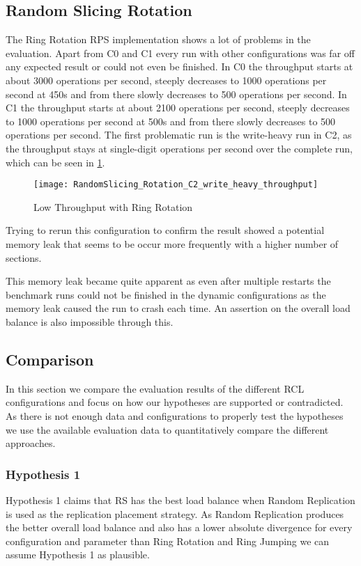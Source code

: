 \subsection{Random Slicing Rotation}
The Ring Rotation \ac{RPS} implementation shows a lot of problems in the evaluation.
Apart from C0 and C1 every run with other configurations was far off any expected result or could not even be finished.
In C0 the throughput starts at about 3000 operations per second, steeply decreases to 1000 operations per second at 450s and from there slowly decreases to 500 operations per second.
In C1 the throughput starts at about 2100 operations per second, steeply decreases to 1000 operations per second at 500s and from there slowly decreases to 500 operations per second.
The first problematic run is the write-heavy run in C2, as the throughput stays at single-digit operations per second over the complete run, which can be seen in \cref{fig:random_slicing_rotation_throughput}.
\begin{figure}
\center
\texttt{[image: RandomSlicing\_Rotation\_C2\_write\_heavy\_throughput]}
\caption[Low Throughput with Ring Rotation]{Low Throughput with Ring Rotation}
\label{fig:random_slicing_rotation_throughput}
\end{figure}
Trying to rerun this configuration to confirm the result showed a potential memory leak that seems to be occur more frequently with a higher number of sections.

This memory leak became quite apparent as even after multiple restarts the benchmark runs could not be finished in the dynamic configurations as the memory leak caused the run to crash each time.
An assertion on the overall load balance is also impossible through this.


\subsection{Comparison}
In this section we compare the evaluation results of the different \ac{RCL} configurations and focus on how our hypotheses are supported or contradicted.
As there is not enough data and configurations to properly test the hypotheses we use the available evaluation data to quantitatively compare the different approaches.

\subsubsection{Hypothesis 1}
Hypothesis 1 claims that \ac{RS} has the best load balance when Random Replication is used as the replication placement strategy.
As Random Replication produces the better overall load balance and also has a lower absolute divergence for every configuration and parameter than Ring Rotation and Ring Jumping we can assume Hypothesis 1 as plausible.


